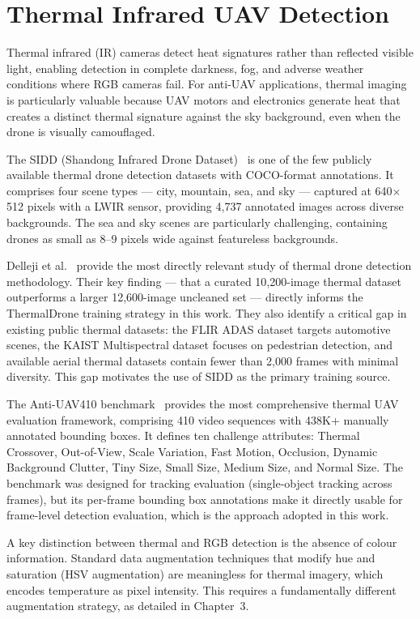 \documentclass[12pt,a4paper]{report}
\begin{document}
\section{Thermal Infrared UAV Detection}

Thermal infrared (IR) cameras detect heat signatures rather than reflected
visible light, enabling detection in complete darkness, fog, and adverse
weather conditions where RGB cameras fail. For anti-UAV applications,
thermal imaging is particularly valuable because UAV motors and electronics
generate heat that creates a distinct thermal signature against the sky
background, even when the drone is visually camouflaged.

The SIDD (Shandong Infrared Drone Dataset)~\cite{sidd2023} is one of the
few publicly available thermal drone detection datasets with COCO-format
annotations. It comprises four scene types --- city, mountain, sea, and
sky --- captured at 640$\times$512 pixels with a LWIR sensor, providing
4,737 annotated images across diverse backgrounds. The sea and sky scenes
are particularly challenging, containing drones as small as 8--9 pixels
wide against featureless backgrounds.

Delleji et al.~\cite{delleji2025thermal} provide the most directly relevant
study of thermal drone detection methodology. Their key finding --- that a
curated 10,200-image thermal dataset outperforms a larger 12,600-image
uncleaned set --- directly informs the ThermalDrone training strategy in
this work. They also identify a critical gap in existing public thermal
datasets: the FLIR ADAS dataset targets automotive scenes, the KAIST
Multispectral dataset focuses on pedestrian detection, and available aerial
thermal datasets contain fewer than 2,000 frames with minimal diversity.
This gap motivates the use of SIDD as the primary training source.

The Anti-UAV410 benchmark~\cite{antiuav410_2023} provides the most
comprehensive thermal UAV evaluation framework, comprising 410 video
sequences with 438K+ manually annotated bounding boxes. It defines ten
challenge attributes: Thermal Crossover, Out-of-View, Scale Variation,
Fast Motion, Occlusion, Dynamic Background Clutter, Tiny Size, Small Size,
Medium Size, and Normal Size. The benchmark was designed for tracking
evaluation (single-object tracking across frames), but its per-frame
bounding box annotations make it directly usable for frame-level detection
evaluation, which is the approach adopted in this work.

A key distinction between thermal and RGB detection is the absence of
colour information. Standard data augmentation techniques that modify
hue and saturation (HSV augmentation) are meaningless for thermal imagery,
which encodes temperature as pixel intensity. This requires a fundamentally
different augmentation strategy, as detailed in Chapter~3.
\end{document}
